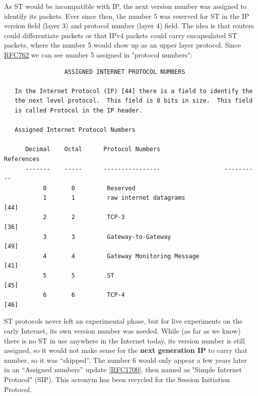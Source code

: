 \documentclass[
]{article}
\begin{document}
As ST would be incompatible with IP, the next version number was
assigned to identify its packets. Ever since then, the number 5 was
reserved for ST in the IP version field (layer 3) and protocol number
(layer 4) field. The idea is that routers could differentiate packets or
that IPv4 packets could carry encapsulated ST packets, where the number
5 would show up as an upper layer protocol. Since
\href{https://www.rfc-editor.org/info/rfc762}{RFC762} we can see number
5 assigned in "protocol numbers":

\begin{verbatim}
                 ASSIGNED INTERNET PROTOCOL NUMBERS

   In the Internet Protocol (IP) [44] there is a field to identify the
   the next level protocol.  This field is 8 bits in size.  This field
   is called Protocol in the IP header.

   Assigned Internet Protocol Numbers

      Decimal    Octal      Protocol Numbers                  References
      -------    -----      ----------------                  ----------
           0       0         Reserved
           1       1         raw internet datagrams                 [44]
           2       2         TCP-3                                  [36]
           3       3         Gateway-to-Gateway                     [49]
           4       4         Gateway Monitoring Message             [41]
           5       5         ST                                     [45]
           6       6         TCP-4                                  [46]
\end{verbatim}

ST protocols never left an experimental phase, but for live experiments
on the early Internet, its own version number was needed. While (as far
as we know) there is no ST in use anywhere in the Internet today, its
version number is still assigned, so it would not make sense for the
\textbf{next generation IP} to carry that number, so it was ``skipped''.
The number 6 would only appear a few years later in an ``Assigned
numbers'' update
{[}\href{https://www.rfc-editor.org/info/rfc1700}{RFC1700}{]}, then
named as "Simple Internet Protocol" (SIP). This acronym has been
recycled for the Session Initiation Protocol.
\end{document}

